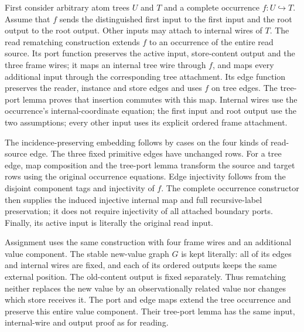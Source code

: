 First consider arbitrary atom trees $U$ and $T$ and a complete occurrence
$f:U\hookrightarrow T$. Assume that $f$ sends the distinguished first input
to the first input and the root output to the root output. Other inputs may
attach to internal wires of $T$. The read rematching construction extends $f$
to an occurrence of the entire read source. Its port function preserves the
active input, store-content output and the three frame wires; it maps an
internal tree wire through $f$, and maps every additional input through the
corresponding tree attachment. Its edge function preserves the reader,
instance and store edges and uses $f$ on tree edges. The tree-port lemma
proves that insertion commutes with this map. Internal wires use the
occurrence's internal-coordinate equation; the first input and root output
use the two assumptions; every other input uses its explicit ordered frame
attachment.

The incidence-preserving embedding follows by cases on the four kinds of
read-source edge. The three fixed primitive edges have unchanged rows.
For a tree edge, map composition and the tree-port lemma transform the
source and target rows using the original occurrence equations. Edge
injectivity follows from the disjoint component tags and injectivity of $f$.
The complete occurrence constructor then supplies the induced injective
internal map and full recursive-label preservation; it does not require
injectivity of all attached boundary ports. Finally, its active input is
literally the original read input.

Assignment uses the same construction with four frame wires and an
additional value component. The stable new-value graph $G$ is kept literally:
all of its edges and internal wires are fixed, and each of its ordered outputs
keeps the same external position. The old-content output is fixed separately.
Thus rematching neither replaces the new value by an observationally related
value nor changes which store receives it. The port and edge maps extend the
tree occurrence and preserve this entire value component. Their tree-port
lemma has the same input, internal-wire and output proof as for reading.


